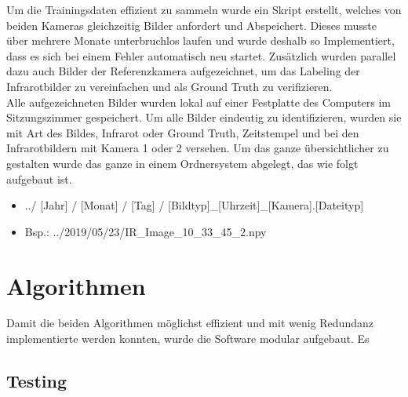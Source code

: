 Um die Trainingsdaten effizient zu sammeln wurde ein  Skript erstellt, welches von beiden Kameras gleichzeitig Bilder anfordert und Abspeichert. Dieses musste über mehrere Monate unterbruchlos laufen und wurde deshalb so Implementiert, dass es sich bei einem Fehler automatisch neu startet. Zusätzlich wurden parallel dazu auch Bilder der Referenzkamera aufgezeichnet, um das Labeling der Infrarotbilder zu vereinfachen und als Ground Truth zu verifizieren.\\
Alle aufgezeichneten Bilder wurden lokal auf einer Festplatte des Computers im Sitzungszimmer gespeichert. Um alle Bilder eindeutig zu identifizieren, wurden sie mit Art des Bildes, Infrarot oder Ground Truth, Zeitstempel und bei den Infrarotbildern mit Kamera 1 oder 2 versehen. Um das ganze übersichtlicher zu gestalten wurde das ganze in einem Ordnersystem abgelegt, das wie folgt aufgebaut ist.

\begin{itemize}
	\item ../ [Jahr] / [Monat] / [Tag] / [Bildtyp]\_[Uhrzeit]\_[Kamera].[Dateityp]
	\item Bsp.: ../2019/05/23/IR\_Image\_10\_33\_45\_2.npy
\end{itemize}


\section{Algorithmen}

Damit die beiden Algorithmen möglichst effizient und mit wenig Redundanz implementierte werden konnten, wurde die Software modular aufgebaut. Es 


\subsection{Testing}
